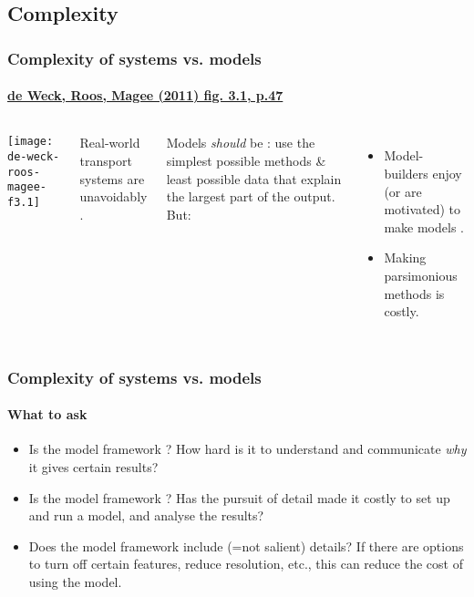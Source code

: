 \documentclass[12pt,aspectratio=169]{beamer}
\begin{document}
\subsection{Complexity}
\begin{frame}
\frametitle{Complexity of systems vs. models}
\framesubtitle{\href{https://mitpress.mit.edu/books/engineering-systems}{de Weck, Roos, Magee (2011) fig. 3.1, p.47}}

\begin{columns}
\texttt{[image: de-weck-roos-magee-f3.1]}

Real-world transport systems are unavoidably .

\medskip
Models \emph{should} be : use the simplest possible methods \& least possible data that explain the largest part of the output.
But:

\begin{itemize}
  \item Model-builders enjoy (or are motivated) to make models .
  \item Making parsimonious methods is costly.
\end{itemize}
\end{columns}

\end{frame}

\begin{frame}
\frametitle{Complexity of systems vs. models}
\framesubtitle{What to ask}

\begin{itemize}
  \item Is the model framework ?
    How hard is it to understand and communicate \emph{why} it gives certain results?
  \item Is the model framework ?
    Has the pursuit of detail made it costly to set up and run a model, and analyse the results?
  \item Does the model framework include  (=not salient) details?
    If there are options to turn off certain features, reduce resolution, etc., this can reduce the cost of using the model.
\end{itemize}

\end{frame}
\end{document}
